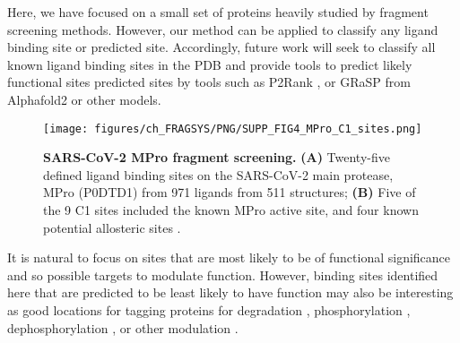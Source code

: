 Here, we have focused on a small set of proteins heavily studied by fragment screening methods. However, our method can be applied to classify any ligand binding site or predicted site. Accordingly, future work will seek to classify all known ligand binding sites in the PDB and provide tools to predict likely functional sites predicted sites by tools such as P2Rank \cite{KRIVAK_2018_P2RANK}, or GRaSP \cite{SANTANA_2020_GRaSP, SANTANA_2022_GRaSP} from Alphafold2 \cite{JUMPER_2021_ALPHAFOLD, VARADI_2022_ALPHAFOLDDB} or other models.

\begin{figure}[ht!]
    \centering
    \texttt{[image: figures/ch\_FRAGSYS/PNG/SUPP\_FIG4\_MPro\_C1\_sites.png]}
    \caption[SARS-CoV-2 MPro fragment screening]{\textbf{SARS-CoV-2 MPro fragment screening.} \textbf{(A)} Twenty-five defined ligand binding sites on the SARS-CoV-2 main protease, MPro (P0DTD1) from 971 ligands from 511 structures; \textbf{(B)} Five of the 9 C1 sites included the known MPro active site, and four known potential allosteric sites \cite{DOUANGAMATH_2020_SARSCOV2, DASGUPTA_2022_ALLOSTERIC}.}
    \label{fig:MPro_showcase}
\end{figure}

It is natural to focus on sites that are most likely to be of functional significance and so possible targets to modulate function. However, binding sites identified here that are predicted to be least likely to have function may also be interesting as good locations for tagging proteins for degradation \cite{BEKES_2022_PROTACS}, phosphorylation \cite{SIRIWARDENA_2020_PHOSPHO}, dephosphorylation \cite{SIMPSON_2023_ADPROM}, or other modulation \cite{HEITEL_2023_PTMS, PENG_2023_PTMS}.

